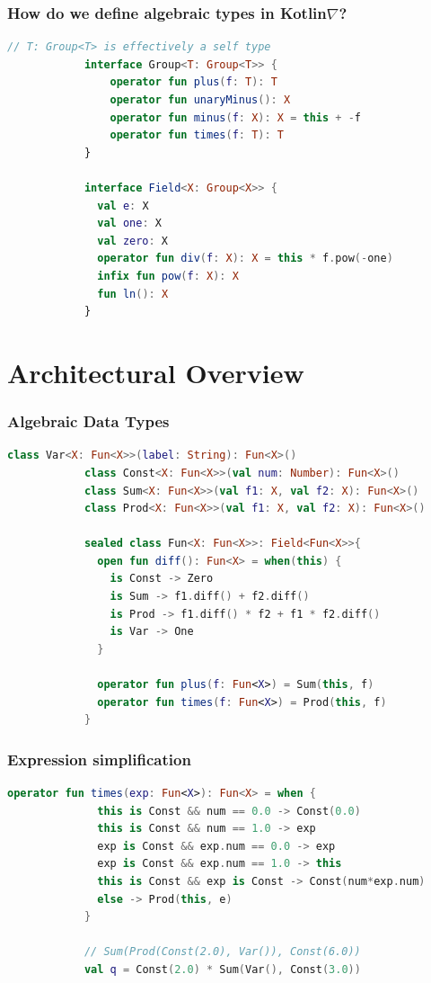 \documentclass{beamer}
\begin{document}
    \begin{frame}[fragile]
        \frametitle{How do we define algebraic types in Kotlin\texorpdfstring{$\nabla$}{}?}
        \begin{lstlisting}[language=Kotlin, gobble=12]
            // T: Group<T> is effectively a self type
            interface Group<T: Group<T>> {
                operator fun plus(f: T): T
                operator fun unaryMinus(): X
                operator fun minus(f: X): X = this + -f
                operator fun times(f: T): T
            }

            interface Field<X: Group<X>> {
              val e: X
              val one: X
              val zero: X
              operator fun div(f: X): X = this * f.pow(-one)
              infix fun pow(f: X): X
              fun ln(): X
            }
        \end{lstlisting}
    \end{frame}


    \section{Architectural Overview}\label{sec:third-section}

    \begin{frame}[fragile]
        \frametitle{Algebraic Data Types}
        \begin{lstlisting}[language=Kotlin, gobble=12]
            class Var<X: Fun<X>>(label: String): Fun<X>()
            class Const<X: Fun<X>>(val num: Number): Fun<X>()
            class Sum<X: Fun<X>>(val f1: X, val f2: X): Fun<X>()
            class Prod<X: Fun<X>>(val f1: X, val f2: X): Fun<X>()

            sealed class Fun<X: Fun<X>>: Field<Fun<X>>{
              open fun diff(): Fun<X> = when(this) {
                is Const -> Zero
                is Sum -> f1.diff() + f2.diff()
                is Prod -> f1.diff() * f2 + f1 * f2.diff()
                is Var -> One
              }

              operator fun plus(f: Fun<X>) = Sum(this, f)
              operator fun times(f: Fun<X>) = Prod(this, f)
            }
        \end{lstlisting}
    \end{frame}

    \begin{frame}[fragile]
        \frametitle{Expression simplification}
        \begin{lstlisting}[language=Kotlin, gobble=12]
            operator fun times(exp: Fun<X>): Fun<X> = when {
              this is Const && num == 0.0 -> Const(0.0)
              this is Const && num == 1.0 -> exp
              exp is Const && exp.num == 0.0 -> exp
              exp is Const && exp.num == 1.0 -> this
              this is Const && exp is Const -> Const(num*exp.num)
              else -> Prod(this, e)
            }

            // Sum(Prod(Const(2.0), Var()), Const(6.0))
            val q = Const(2.0) * Sum(Var(), Const(3.0))
        \end{lstlisting}
    \end{frame}
\end{document}
